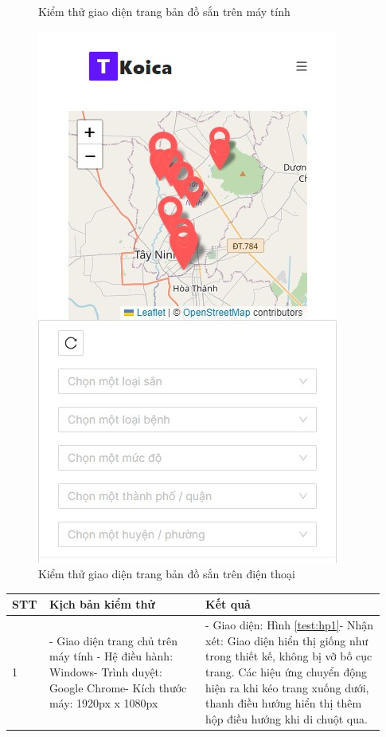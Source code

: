 \documentclass[./../main.tex]{subfiles}
\begin{document}
\begin{itemize}
\begin{figure}[H]
        \caption{Kiểm thử giao diện trang bản đồ sắn trên máy tính}
        \label{test:map1}
    \end{figure}
    \begin{figure}[H]
    \centering
        \includegraphics[height=0.5\textheight,keepaspectratio]{./img/test_map2.jpeg}
        \caption{Kiểm thử giao diện trang bản đồ sắn trên điện thoại}
        \label{test:map2}
    \end{figure}
    \begin{longtable}{| p{0.07\linewidth} | p{0.4\linewidth} | p{0.46\linewidth} |}
        \hline
        \textbf{STT} & \textbf{Kịch bản kiểm thử} & \textbf{Kết quả} \\ \hline
        \centerline{1} & - Giao diện trang chủ trên máy tính \newline - Hệ điều hành: Windows\newline - Trình duyệt: Google Chrome\newline - Kích thước máy: 1920px x 1080px & - Giao diện: Hình \ref{test:hp1}\newline - Nhận xét: Giao diện hiển thị giống như trong thiết kế, không bị vỡ bố cục trang. Các hiệu ứng chuyển động hiện ra khi kéo trang xuống dưới, thanh điều hướng hiển thị thêm hộp điều hướng khi di chuột qua.\\ \hline

\end{longtable}
\end{itemize}
\end{document}
